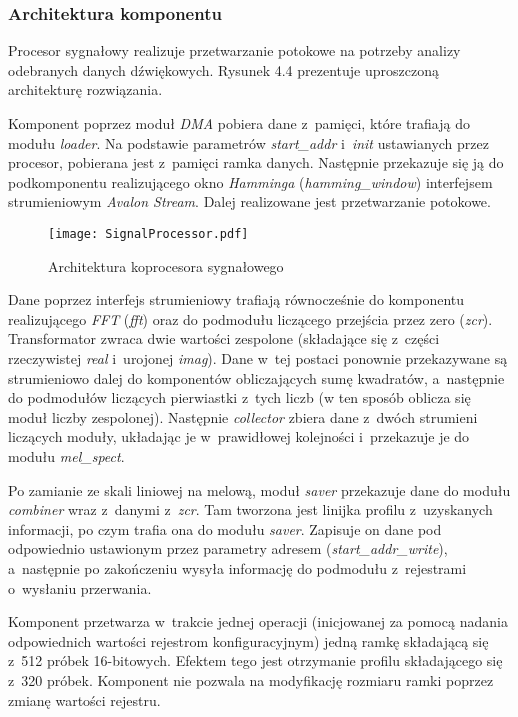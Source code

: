 \subsubsection{Architektura komponentu}

Procesor sygnałowy realizuje przetwarzanie potokowe na potrzeby analizy odebranych danych dźwiękowych. Rysunek 4.4 prezentuje uproszczoną architekturę rozwiązania.

Komponent poprzez moduł \textit{DMA} pobiera dane z~pamięci, które trafiają do modułu \textit{loader}. Na podstawie parametrów \textit{start\_addr} i~\textit{init} ustawianych przez procesor, pobierana jest z~pamięci ramka danych. Następnie przekazuje się ją do podkomponentu realizującego okno \textit{Hamminga} (\textit{hamming\_window}) interfejsem strumieniowym \textit{Avalon Stream}. Dalej realizowane jest przetwarzanie potokowe.

\begin{figure}[h]
	\centering
	\texttt{[image: SignalProcessor.pdf]}
	\caption{Architektura koprocesora sygnałowego}
\end{figure}
\FloatBarrier %

Dane poprzez interfejs strumieniowy trafiają równocześnie do komponentu realizującego \textit{FFT} (\textit{fft}) oraz do podmodułu liczącego przejścia przez zero (\textit{zcr}). Transformator zwraca dwie wartości zespolone (składające się z~części rzeczywistej \textit{real} i~urojonej \textit{imag}). Dane w~tej postaci ponownie przekazywane są strumieniowo dalej do komponentów obliczających sumę kwadratów, a~następnie do podmodułów liczących pierwiastki z~tych liczb (w ten sposób oblicza się moduł liczby zespolonej). Następnie \textit{collector} zbiera dane z~dwóch strumieni liczących moduły, układając je w~prawidłowej kolejności i~przekazuje je do modułu \textit{mel\_spect}.

Po zamianie ze skali liniowej na melową, moduł \textit{saver} przekazuje dane do modułu \textit{combiner} wraz z~danymi z~\textit{zcr}. Tam tworzona jest linijka profilu z~uzyskanych informacji, po czym trafia ona do modułu \textit{saver}. Zapisuje on dane pod odpowiednio ustawionym przez parametry adresem (\textit{start\_addr\_write}), a~następnie po zakończeniu wysyła informację do podmodułu z~rejestrami o~wysłaniu przerwania.

Komponent przetwarza w~trakcie jednej operacji (inicjowanej za pomocą nadania odpowiednich wartości rejestrom konfiguracyjnym) jedną ramkę składającą się z~512 próbek 16-bitowych. Efektem tego jest otrzymanie profilu składającego się z~320 próbek. Komponent nie pozwala na modyfikację rozmiaru ramki poprzez zmianę wartości rejestru.

